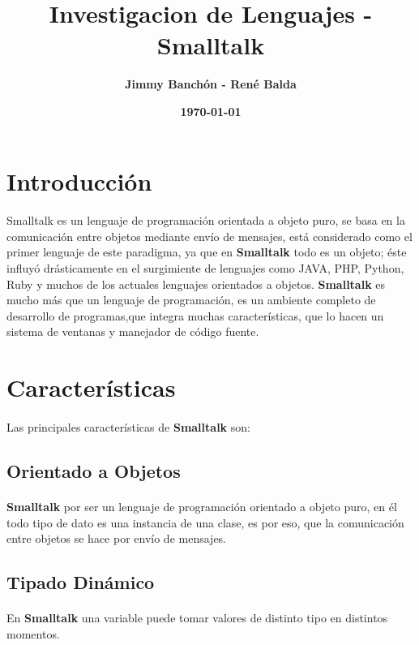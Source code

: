 \documentclass[11pt]{article}
\title{\textbf{Investigacion de Lenguajes - Smalltalk}}
\author{\textbf{Jimmy Banchón - René Balda}}
\date{\textbf{\today}}
\begin{document}


\maketitle
\section{\textbf{Introducción}}
\paragraph{} \noindent
Smalltalk es un lenguaje de programación orientada a objeto puro, se basa en la comunicación entre objetos mediante envío de mensajes, está considerado como el primer lenguaje de este paradigma, ya que  en \textbf{Smalltalk} todo es un objeto; éste influyó drásticamente en el surgimiente de lenguajes como JAVA, PHP, Python, Ruby y muchos de los actuales lenguajes orientados a objetos.
 \textbf{Smalltalk} es mucho más que un lenguaje de programación, es un ambiente completo de desarrollo de programas,que integra muchas características, que lo hacen un sistema de ventanas y manejador de código fuente.\cite{discover}
\section{\textbf{Características}}
\paragraph{} \noindent
Las principales características de  \textbf{Smalltalk} son:
\subsection{\textbf{Orientado a Objetos}}
\paragraph{} \noindent
\textbf{Smalltalk} por ser un lenguaje de programación orientado a objeto puro, en él todo tipo de dato es una instancia de una clase, es por eso, que la comunicación entre objetos se hace por envío de mensajes.
\subsection{\textbf{Tipado Dinámico}}
\paragraph{} \noindent
En \textbf{Smalltalk} una variable puede tomar valores de distinto tipo en distintos momentos.
\end{document}
